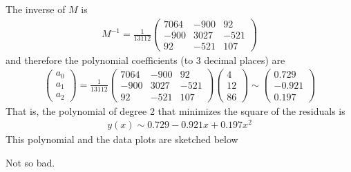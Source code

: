 {	The inverse of $M$ is
	\begin{align*}
	M^{-1} = \frac{1}{13112}\begin{pmatrix}
	7064 & -900 & 92 \\
	-900 & 3027 & -521 \\
	92 & -521 & 107
	\end{pmatrix}
	\end{align*}
	and therefore the polynomial coefficients (to 3 decimal places) are
	\begin{align*}
	\begin{pmatrix}
	a_0 \\ a_1 \\ a_2
	\end{pmatrix}
	=
	\frac{1}{13112}\begin{pmatrix}
	7064 & -900 &   92 \\
	-900 & 3027 & -521 \\
	  92 & -521 &  107
	\end{pmatrix}
	\begin{pmatrix}
	4 \\ 
	12 \\ 
	86
	\end{pmatrix}
	\sim
	\begin{pmatrix}
	 0.729 \\
	-0.921 \\
	 0.197
	\end{pmatrix}
	\end{align*}
	That is, the polynomial of degree 2 that minimizes the square of the residuals is
	\begin{align*}
	y(x) \sim 0.729 - 0.921 x + 0.197 x^2 
	\end{align*}
	This polynomial and the data plots are sketched below
	\begin{figure}[H]
	\centering
	\end{figure}
	Not so bad.
}{\downline}



